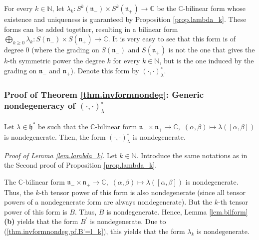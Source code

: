 \documentclass[etingof-lie.tex]{subfiles}
\begin{document}
\begin{definition}
\label{def.lambda_k}For every $k\in\mathbb{N}$, let $\lambda_{k}:S^{k}\left(
\mathfrak{n}_{-}\right)  \times S^{k}\left(  \mathfrak{n}_{+}\right)
\rightarrow\mathbb{C}$ be the $\mathbb{C}$-bilinear form whose existence and
uniqueness is guaranteed by Proposition \ref{prop.lambda_k}. These forms can
be added together, resulting in a bilinear form $\bigoplus\limits_{k\geq
0}\lambda_{k}:S\left(  \mathfrak{n}_{-}\right)  \times S\left(  \mathfrak{n}%
_{+}\right)  \rightarrow\mathbb{C}$. It is very easy to see that this form is
of degree $0$ (where the grading on $S\left(  \mathfrak{n}_{-}\right)  $ and
$S\left(  \mathfrak{n}_{+}\right)  $ is not the one that gives the $k$-th
symmetric power the degree $k$ for every $k\in\mathbb{N}$, but is the one
induced by the grading on $\mathfrak{n}_{-}$ and $\mathfrak{n}_{+}$). Denote
this form by $\left(  \cdot,\cdot\right)  _{\lambda}^{\circ}$.
\end{definition}

\subsubsection{Proof of Theorem \ref{thm.invformnondeg}: Generic nondegeneracy
of \texorpdfstring{$\left(  \cdot,\cdot\right)  _{\lambda}^{\circ}$}{the
form induced by lambda on the symmetric power}}

\begin{lemma}
\label{lem.lambda_k}Let $\lambda\in\mathfrak{h}^{\ast}$ be such that the
$\mathbb{C}$-bilinear form $\mathfrak{n}_{-}\times\mathfrak{n}_{+}%
\rightarrow\mathbb{C},$ $\left(  \alpha,\beta\right)  \mapsto\lambda\left(
\left[  \alpha,\beta\right]  \right)  $ is nondegenerate. Then, the form
$\left(  \cdot,\cdot\right)  _{\lambda}^{\circ}$ is nondegenerate.
\end{lemma}

\textit{Proof of Lemma \ref{lem.lambda_k}.} Let $k\in\mathbb{N}$. Introduce
the same notations as in the Second proof of Proposition \ref{prop.lambda_k}.

The $\mathbb{C}$-bilinear form $\mathfrak{n}_{-}\times\mathfrak{n}%
_{+}\rightarrow\mathbb{C},$ $\left(  \alpha,\beta\right)  \mapsto
\lambda\left(  \left[  \alpha,\beta\right]  \right)  $ is nondegenerate. Thus,
the $k$-th tensor power of this form is also nondegenerate (since all tensor
powers of a nondegenerate form are always nondegenerate). But the $k$-th
tensor power of this form is $B$. Thus, $B$ is nondegenerate. Hence, Lemma
\ref{lem.bilform} \textbf{(b)} yields that the form $B^{\prime}$ is
nondegenerate. Due to (\ref{thm.invformnondeg.pf.B'=l_k}), this yields that
the form $\lambda_{k}$ is nondegenerate.
\end{document}
